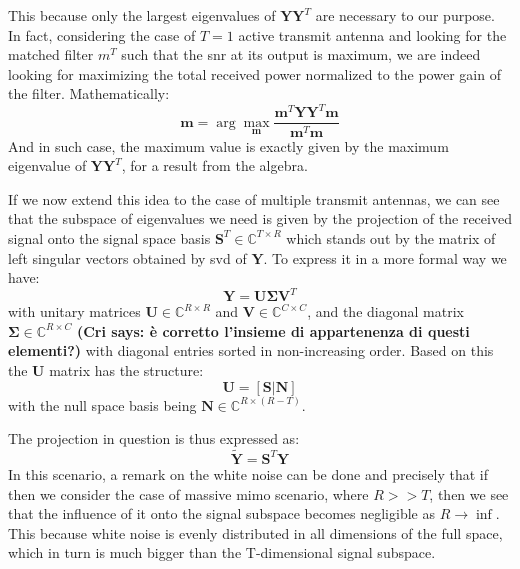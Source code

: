 \documentclass[11pt]{book}
\newcommand{\argmax}{\arg\!\max} %
\newcommand{\cri}[1]{\textcolor{MyColor2}{\textbf{(Cri says: #1)}}}
\begin{document}
This because only the largest eigenvalues of $\mathbf{Y}\mathbf{Y}^T$ are necessary to our purpose. In fact, considering the case of $T = 1$ active transmit antenna and looking for the matched filter $m^T$ such that the \gls{snr} at its output is maximum, we are indeed looking for maximizing the total received power normalized to the power gain of the filter. Mathematically:
\begin{equation}
  \mathbf{m} = \argmax_{\mathbf{m}}\frac{\mathbf{m}^T\mathbf{Y}\mathbf{Y}^T\mathbf{m}}{\mathbf{m}^T\mathbf{m}}
\end{equation}
And in such case, the maximum value is exactly given by the maximum eigenvalue of $\mathbf{Y}\mathbf{Y}^T$, for a result from the algebra.

If we now extend this idea to the case of multiple transmit antennas, we can see that the subspace of eigenvalues we need is given by the projection of the received signal onto the signal space basis $\mathbf{S}^T \in \mathbb{C}^{T\times R}$ which stands out by the matrix of left singular vectors obtained by \gls{svd} of $\mathbf{Y}$. To express it in a more formal way we have:
\begin{equation}
  \mathbf{Y} = \mathbf{U} \mathbf{\Sigma} \mathbf{V}^T
\end{equation}
with unitary matrices $\mathbf{U} \in \mathbb{C}^{R\times R}$ and $\mathbf{V} \in \mathbb{C}^{C\times C}$, and the diagonal matrix $\mathbf{\Sigma} \in \mathbb{C}^{R\times C}$ \cri{è corretto l'insieme di appartenenza di questi elementi?} with diagonal entries sorted in non-increasing order. Based on this the $\mathbf{U}$ matrix has the structure:
\begin{equation}
  \mathbf{U} = [\mathbf{S|\mathbf{N}}]
\end{equation}
with the null space basis being $\mathbf{N} \in \mathbb{C}^{R\times (R-T)}$.

The projection in question is thus expressed as:
\begin{equation}
  \mathbf{\tilde{Y}} = \mathbf{S}^T\mathbf{Y}
\end{equation}
In this scenario, a remark on the white noise can be done and precisely that if then we consider the case of massive \gls{mimo} scenario, where $R >> T$, then we see that the influence of it onto the signal subspace becomes negligible as $R \rightarrow \inf$. This because white noise is evenly distributed in all dimensions of the full space, which in turn is much bigger than the T-dimensional signal subspace.
\end{document}
